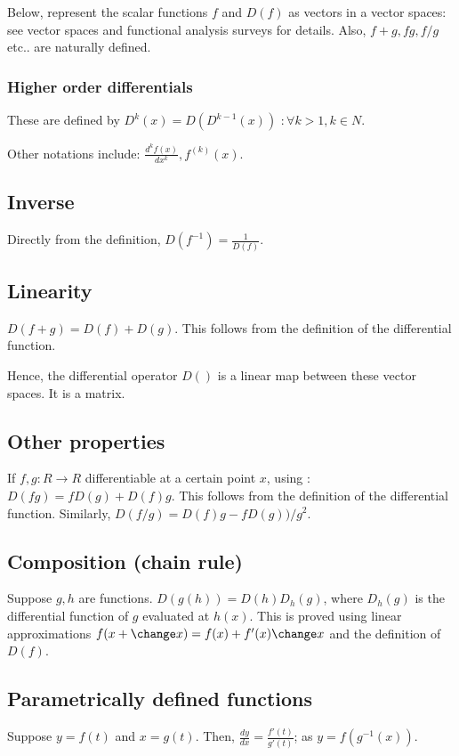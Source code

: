 \documentclass[oneside, article]{memoir}
\begin{document}
Below, represent the scalar functions $f$ and $D(f)$ as vectors in a vector spaces: see vector spaces and functional analysis surveys for details. Also, $f+g, fg, f/g$ etc.. are naturally defined.

\subsubsection{Higher order differentials}
These are defined by $D^k(x) = D(D^{k-1}(x))$ $: \forall k > 1, k \in N$.

Other notations include: $\frac{d^{k}f(x)}{dx^k}, f^{(k)}(x)$.

\subsection{Inverse}
Directly from the definition, $D(f^{-1}) = \frac{1}{D(f)}$.

\subsection{Linearity}
$D(f + g) = D(f) + D(g)$. This follows from the definition of the differential function.

Hence, the differential operator $D()$ is a linear map between these vector spaces. It is a matrix.

\subsection{Other properties}
If $f, g: R \to R$ differentiable at a certain point $x$, using :
$D(fg) = f D(g) + D(f)g$. This follows from the definition of the differential function. Similarly, $D(f/g) = D(f)g - fD(g))/g^2$.

\subsection{Composition (chain rule)}
Suppose $g, h$ are functions. $D(g(h)) = D(h)D_h(g)$, where $D_h(g)$ is the differential function of $g$ evaluated at $h(x)$. This is proved using linear approximations $f(x + \change x) = f(x) + f'(x)\change x$ and the definition of $D(f)$.

\subsection{Parametrically defined functions}
Suppose $y = f(t)$ and $x = g(t)$. Then, $\frac{dy}{dx} = \frac{f'(t)}{g'(t)}$; as $y = f(g^{-1}(x))$.
\end{document}
